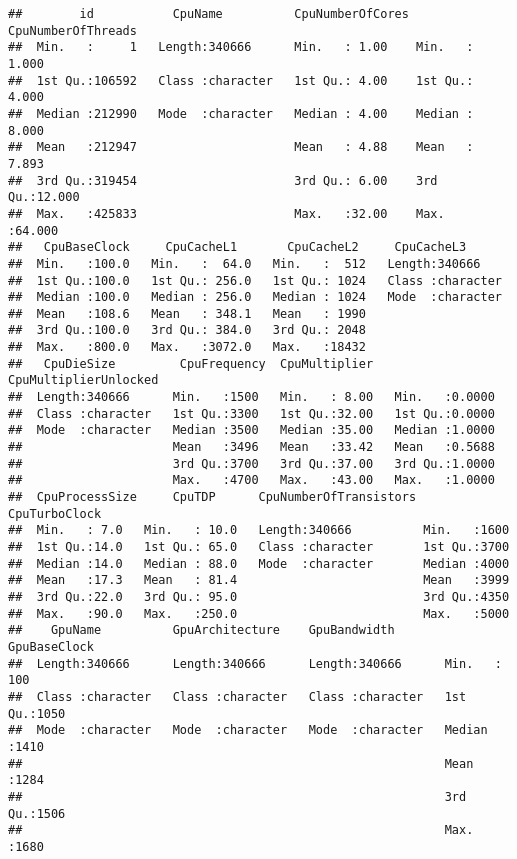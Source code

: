 \documentclass[
]{article}
\begin{document}
\begin{verbatim}
##        id           CpuName          CpuNumberOfCores CpuNumberOfThreads
##  Min.   :     1   Length:340666      Min.   : 1.00    Min.   : 1.000    
##  1st Qu.:106592   Class :character   1st Qu.: 4.00    1st Qu.: 4.000    
##  Median :212990   Mode  :character   Median : 4.00    Median : 8.000    
##  Mean   :212947                      Mean   : 4.88    Mean   : 7.893    
##  3rd Qu.:319454                      3rd Qu.: 6.00    3rd Qu.:12.000    
##  Max.   :425833                      Max.   :32.00    Max.   :64.000    
##   CpuBaseClock     CpuCacheL1       CpuCacheL2     CpuCacheL3       
##  Min.   :100.0   Min.   :  64.0   Min.   :  512   Length:340666     
##  1st Qu.:100.0   1st Qu.: 256.0   1st Qu.: 1024   Class :character  
##  Median :100.0   Median : 256.0   Median : 1024   Mode  :character  
##  Mean   :108.6   Mean   : 348.1   Mean   : 1990                     
##  3rd Qu.:100.0   3rd Qu.: 384.0   3rd Qu.: 2048                     
##  Max.   :800.0   Max.   :3072.0   Max.   :18432                     
##   CpuDieSize         CpuFrequency  CpuMultiplier   CpuMultiplierUnlocked
##  Length:340666      Min.   :1500   Min.   : 8.00   Min.   :0.0000       
##  Class :character   1st Qu.:3300   1st Qu.:32.00   1st Qu.:0.0000       
##  Mode  :character   Median :3500   Median :35.00   Median :1.0000       
##                     Mean   :3496   Mean   :33.42   Mean   :0.5688       
##                     3rd Qu.:3700   3rd Qu.:37.00   3rd Qu.:1.0000       
##                     Max.   :4700   Max.   :43.00   Max.   :1.0000       
##  CpuProcessSize     CpuTDP      CpuNumberOfTransistors CpuTurboClock 
##  Min.   : 7.0   Min.   : 10.0   Length:340666          Min.   :1600  
##  1st Qu.:14.0   1st Qu.: 65.0   Class :character       1st Qu.:3700  
##  Median :14.0   Median : 88.0   Mode  :character       Median :4000  
##  Mean   :17.3   Mean   : 81.4                          Mean   :3999  
##  3rd Qu.:22.0   3rd Qu.: 95.0                          3rd Qu.:4350  
##  Max.   :90.0   Max.   :250.0                          Max.   :5000  
##    GpuName          GpuArchitecture    GpuBandwidth        GpuBaseClock 
##  Length:340666      Length:340666      Length:340666      Min.   : 100  
##  Class :character   Class :character   Class :character   1st Qu.:1050  
##  Mode  :character   Mode  :character   Mode  :character   Median :1410  
##                                                           Mean   :1284  
##                                                           3rd Qu.:1506  
##                                                           Max.   :1680  

\end{verbatim}
\end{document}
